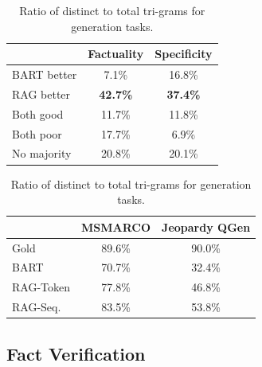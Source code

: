 \begin{table}[t]
\begin{minipage}[b]{0.49\linewidth}
\centering
\small
\caption{Human assessments for the Jeopardy Question Generation Task.}
\vspace{5pt}
    \begin{tabular}{lcc}
    \toprule
    &  Factuality & Specificity \\
    \midrule
    BART better & 7.1\% & 16.8\%\\
    RAG better & \textbf{42.7\%} & \textbf{37.4\%} \\
    Both good & 11.7\% & 11.8\%\\
    Both poor & 17.7\% & 6.9\% \\
    No majority & 20.8\% & 20.1\% \\
    \bottomrule
    \end{tabular}
    
    \label{tab:jeopardy}
\end{minipage}
\hspace{0.01\linewidth}
\begin{minipage}[b]{0.49\linewidth}
\centering
 \small
\caption{Ratio of distinct to total tri-grams  for generation tasks.}
\vspace{10pt}
    \begin{tabular}{lcc}
    \toprule
    &   \multicolumn{1}{m{2cm}}{\centering MSMARCO} &  \multicolumn{1}{m{2cm}}{\centering Jeopardy QGen} \\
    \midrule
    Gold  & 89.6\% & 90.0\%\\
    BART  & 70.7\% & 32.4\%\\
    RAG-Token & 77.8\% & 46.8\%\\
    RAG-Seq. & 83.5\% & 53.8\%\\
    \bottomrule
    \end{tabular}

    \label{tab:diversity}
\end{minipage}
\end{table}


\subsection{Fact Verification}

